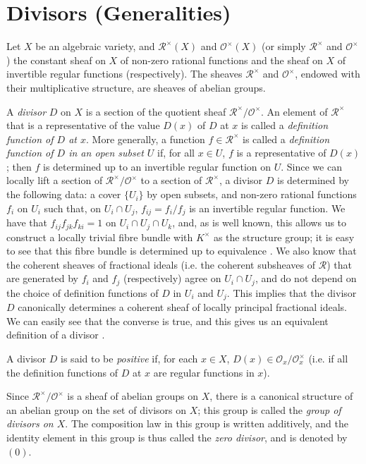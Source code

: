 \documentclass{article}
\theoremstyle{plain}
\theoremstyle{definition}
\newcommand{\sh}{\mathscr}
\newcommand{\oldpage}[1]{\marginpar{\footnotesize$\Big\vert$ \textit{p.~#1}}}
\begin{document}
\section{Divisors (Generalities)}
\label{section3}

\oldpage{4-06}
Let $X$ be an algebraic variety, and $\sh{R}^\times(X)$ and $\sh{O}^\times(X)$ (or simply $\sh{R}^\times$ and $\sh{O}^\times$) the constant sheaf on $X$ of non-zero rational functions and the sheaf on $X$ of invertible regular functions (respectively).
The sheaves $\sh{R}^\times$ and $\sh{O}^\times$, endowed with their multiplicative structure, are sheaves of abelian groups.

A \emph{divisor} $D$ on $X$ is a section of the quotient sheaf $\sh{R}^\times/\sh{O}^\times$.
An element of $\sh{R}^\times$ that is a representative of the value $D(x)$ of $D$ at $x$ is called a \emph{definition function of $D$ at $x$}.
More generally, a function $f\in\sh{R}^\times$ is called a \emph{definition function of $D$ in an open subset $U$} if, for all $x\in U$, $f$ is a representative of $D(x)$; then $f$ is determined up to an invertible regular function on $U$.
Since we can locally lift a section of $\sh{R}^\times/\sh{O}^\times$ to a section of $\sh{R}^\times$, a divisor $D$ is determined by the following data: a cover $\{U_i\}$ by open subsets, and non-zero rational functions $f_i$ on $U_i$ such that, on $U_i\cap U_j$, $f_{ij}=f_i/f_j$ is an invertible regular function.
We have that $f_{ij}f_{jk}f_{ki}=1$ on $U_i\cap U_j\cap U_k$, and, as is well known, this allows us to construct a locally trivial fibre bundle with $K^\times$ as the structure group;
it is easy to see that this fibre bundle is determined up to equivalence \cite{7}.
We also know that the coherent sheaves of fractional ideals (i.e. the coherent subsheaves of $\sh{R}$) that are generated by $f_i$ and $f_j$ (respectively) agree on $U_i\cap U_j$, and do not depend on the choice of definition functions of $D$ in $U_i$ and $U_j$.
This implies that the divisor $D$ canonically determines a coherent sheaf of locally principal fractional ideals.
We can easily see that the converse is true, and this gives us an equivalent definition of a divisor \cite{1}.

A divisor $D$ is said to be \emph{positive} if, for each $x\in X$, $D(x)\in\sh{O}_x/\sh{O}_x^\times$ (i.e. if all the definition functions of $D$ at $x$ are regular functions in $x$).

Since $\sh{R}^\times/\sh{O}^\times$ is a sheaf of abelian groups on $X$, there is a canonical structure of an abelian group on the set of divisors on $X$;
this group is called the \emph{group of divisors on $X$}.
The composition law in this group is written additively, and the identity element in this group is thus called the \emph{zero divisor}, and is denoted by $(0)$.
\end{document}
